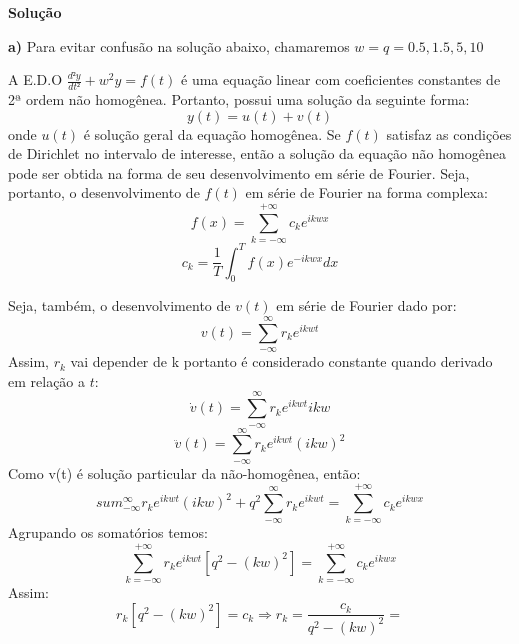 \linespread{1.5}
\textbf{Solução}

\textbf{a)} Para evitar confusão na solução abaixo, chamaremos $w=q=0.5, 1.5, 5, 10$

A E.D.O $\frac{d²y}{dt²} + w^2y = f(t)$ é uma equação linear com coeficientes constantes de 2ª ordem não homogênea. Portanto, possui uma solução da seguinte forma:
\begin{equation*}
    y(t) = u(t) + v(t)
\end{equation*}
onde $u(t)$ é solução geral da equação homogênea. Se $f(t)$ satisfaz as condições de Dirichlet no intervalo de interesse, então a solução da equação não homogênea pode ser obtida na forma de seu desenvolvimento em série de Fourier. Seja, portanto, o desenvolvimento de $f(t)$ em série de Fourier na forma complexa:
\begin{equation}
    \label{eq:Fouriercomplexa}
    f(x) = \sum^{+\infty}_{k=-\infty} c_k e^{ikwx}
\end{equation}
\begin{equation}
    \label{eq:ckFouerier}
    c_k = \frac{1}{T} \int^T_0 f(x)e^{-ikwx}dx
\end{equation}

Seja, também, o desenvolvimento de $v(t)$ em série de Fourier dado por:
\begin{equation*}
    v(t) = \sum^\infty_{-\infty} r_k e^{ikwt}
\end{equation*}
Assim, $r_k$ vai depender de k portanto é considerado constante quando derivado em relação a $t$:
\begin{equation*}
    \dot{v}(t) = \sum^\infty_{-\infty} r_k e^{ikwt}ikw
\end{equation*}
\begin{equation*}
    \ddot{v}(t) = \sum^\infty_{-\infty} r_k e^{ikwt}(ikw)^2
\end{equation*}
Como v(t) é solução particular da não-homogênea, então:
\begin{equation}
    sum^\infty_{-\infty} r_k e^{ikwt}(ikw)^2 + q^2\sum^\infty_{-\infty} r_k e^{ikwt} = \sum^{+\infty}_{k=-\infty} c_k e^{ikwx}
\end{equation}
Agrupando os somatórios temos:
\begin{equation*}
    \sum^{+\infty}_{k=-\infty} r_k e^{ikwt}[q^2 - (kw)^2] = \sum^{+\infty}_{k=-\infty} c_k e^{ikwx}
\end{equation*}
Assim:
\begin{equation*}
    r_k[q^2 - (kw)^2] = c_k \Rightarrow r_k = \frac{c_k}{q^2 - (kw)^2} = 
\end{equation*}

